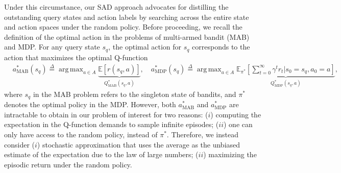 \documentclass[10pt]{article}
\DeclareMathOperator*{\argmax}{arg\,max}
\def\mbE{{\ensuremath{\mathbb E}}}
\begin{document}
Under this circumstance, our SAD approach advocates for distilling the outstanding query states and action labels by searching across the entire state and action spaces under the random policy.
Before proceeding, we recall the definition of the optimal action in the problems of multi-armed bandit (MAB) and MDP. For any query state $s_q$, the optimal action for $s_q$ corresponds to the action that maximizes the optimal Q-function
\begin{align}
    &a_\text{MAB}^*(s_q) \overset{\Delta}{=} \argmax_{a \in A} \underbrace{\mbE \left[ r(s_q, a) \right]}_{Q_\text{MAB}^*(s_q, a)}, \quad a_\text{MDP}^*(s_q) \overset{\Delta}{=} \argmax_{a \in A} \underbrace{\mbE_{\pi^*} \!\! \left[ \sum_{t=0}^\infty \gamma^t  r_t | s_0=s_q, a_0=a \right]}_{Q_\text{MDP}^*(s_q, a)},
\end{align}
where $s_q$ in the MAB problem refers to the singleton state of bandits, and $\pi^*$ denotes the optimal policy in the MDP.
However, both $a_\text{MAB}^*$ and $a_\text{MDP}^*$ are intractable to obtain in our problem of interest for two reasons: ($i$) computing the expectation in the Q-function demands to sample infinite episodes; ($ii$) one can only have access to the random policy, instead of $\pi^*$. Therefore, we instead consider ($i$) stochastic approximation that uses the average as the unbiased estimate of the expectation due to the law of large numbers; ($ii$) maximizing the episodic return under the random policy.
\end{document}
